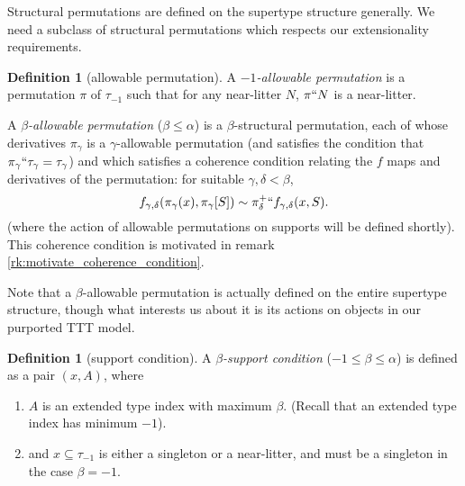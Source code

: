 \documentclass[112pt]{article}
\theoremstyle{definition}
\newtheorem{definition}[theorem]{Definition}
\theoremstyle{remark}
\newcommand{\hsuggest}[1]{{\color{magenta}#1}}
\begin{document}


Structural permutations are defined on the supertype structure generally.  We need a subclass of structural permutations which respects our extensionality requirements.

\begin{definition}[allowable permutation]\label{def:allowable_permutation}
A {\em $-1$-allowable permutation\/} is a permutation $\pi$ of $\tau_{-1}$ such that for any near-litter $N$, $\pi``N$ is a near-litter.

A {\em $\beta$-allowable permutation\/} ($\beta \leq \alpha$) is a $\beta$-structural permutation, each of whose derivatives $\pi_\gamma$ is a $\gamma$-allowable permutation (and satisfies the condition that $\pi_\gamma``\tau_\gamma = \tau_\gamma$) and which satisfies a coherence condition relating the $f$ maps and derivatives of the permutation:  for suitable $\gamma,\delta<\beta$, $$f_{\gamma,\delta}(\pi_\gamma(x),\pi_{\gamma}[S]) \sim \pi_\delta^+``f_{\gamma,\delta}(x,S).$$  (where the action of allowable
  permutations on supports will be defined shortly).
  {This coherence condition is motivated in remark \ref{rk:motivate_coherence_condition}.}
\end{definition}

Note that a $\beta$-allowable permutation is actually defined on the entire supertype structure, though what interests us about it is its actions on objects in our purported TTT model.

\begin{definition}[support condition]\label{def:support_condition}
A {\em $\beta$-support condition\/} ($-1 \leq \beta \leq \alpha$) is defined as a pair $(x,A)$, where
\begin{enumerate}

\item {$A$ is an extended type index with maximum $\beta$.  (Recall that an extended type index has minimum $-1$).}

\item
and $x\subseteq \tau_{-1}$ is either a singleton or a near-litter, and must be a singleton in the case $\beta=-1$.

\end{enumerate}
\end{definition}
\end{document}

